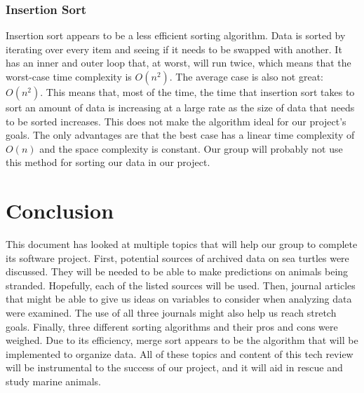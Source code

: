 \documentclass[onecolumn, draftclsnofoot,10pt, compsoc]{IEEEtran}
\begin{document}
\begin{singlespace}
\subsubsection{Insertion Sort}
Insertion sort appears to be a less efficient sorting algorithm. Data is sorted by iterating
over every item and seeing if it needs to be swapped with another. It has an inner and
outer loop that, at worst, will run twice, which means that the worst-case time
complexity is $O(n^{2})$. The average case is also not great: $O(n^{2})$. This means that, most
of the time, the time that insertion sort takes to sort an amount of data is increasing at a
large rate as the size of data that needs to be sorted increases. This does not make the
algorithm ideal for our project's goals. The only advantages are that the best case has a
linear time complexity of $O(n)$ and the space complexity is constant. Our group will
probably not use this method for sorting our data in our project.\cite{CrisanDanielaAlexandra2015Rafs}
\section{Conclusion}
This document has looked at multiple topics that will help our group to complete its software project.  
First, potential sources of archived data on sea turtles were discussed.  
They will be needed to be able to make predictions on animals being stranded.  Hopefully, each of the listed sources will be used.  
Then, journal articles that might be able to give us ideas on variables to consider when analyzing data were examined.  
The use of all three journals might also help us reach stretch goals.  Finally, three different sorting algorithms and their pros and cons were weighed.  
Due to its efficiency, merge sort appears to be the algorithm that will be implemented to organize data.  
All of these topics and content of this tech review will be instrumental to the success of our project, and it will aid in rescue and study marine animals.
\newpage




\end{singlespace}
\end{document}
